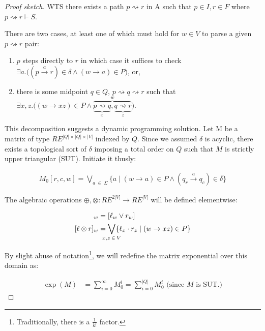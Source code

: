 \documentclass[sigplan,review,acmsmall,nonacm,screen,anonymous]{acmart}\settopmatter{printfolios=false,printccs=false,printacmref=false}
\begin{document}
  \begin{proof}[Proof sketch]
    WTS there exists a path $p \rightsquigarrow r$ in A such that $p\in I, r\in F$ where $p \rightsquigarrow r \vdash S$.\vspace{0.3cm}

    \noindent There are two cases, at least one of which must hold for $w \in V$ to parse a given $p \rightsquigarrow r$ pair:

    \begin{enumerate}
      \item $p$ steps directly to $r$ in which case it suffices to check $\exists a.\big((p \overset{a}{\rightarrow} r)\in \delta \land (w \rightarrow a) \in P\big)$, or,
      \item there is some midpoint $q \in Q$, $p \rightsquigarrow q \rightsquigarrow r$ such that $\exists x, z.\big((w \rightarrow xz) \in P\land\overbrace{\underbrace{p \rightsquigarrow q}_x, \underbrace{q \rightsquigarrow r}_z}^w\big)$.
    \end{enumerate}

    \noindent This decomposition suggests a dynamic programming solution. Let M be a matrix of type $RE^{|Q|\times|Q|\times|V|}$  indexed by $Q$. Since we assumed $\delta$ is acyclic, there exists a topological sort of $\delta$ imposing a total order on $Q$ such that $M$ is strictly upper triangular (SUT). Initiate it thusly:

    \begin{align}
      M_0[r, c, w] = \bigvee_{a\:\in\:\Sigma} \{a \mid (w \rightarrow a) \in P \land (q_r \overset{a}{\rightarrow} q_c)\in \delta\}
    \end{align}

    \noindent The algebraic operations $\oplus, \otimes: RE^{2|V|} \rightarrow RE^{|V|}$ will be defined elementwise:

    \begin{align}
    [\ell \oplus r]_w  &= [\ell_w \lor r_w]\\
    [\ell \otimes r]_w &= \bigvee_{\mathclap{x, z\:\in\:V}}\{\ell_x \cdot r_z \mid (w \rightarrow xz) \in P\}
    \end{align}

    \noindent By slight abuse of notation\footnote{Traditionally, there is a $\frac{1}{k!}$ factor.}, we will redefine the matrix exponential over this domain as:

    \begin{align}
      \exp(M) &= \sum_{i = 0}^\infty M_0^i = \sum_{i = 0}^{|Q|} M_0^i \text { (since $M$ is SUT.)}
    \end{align}


\end{proof}
\end{document}
